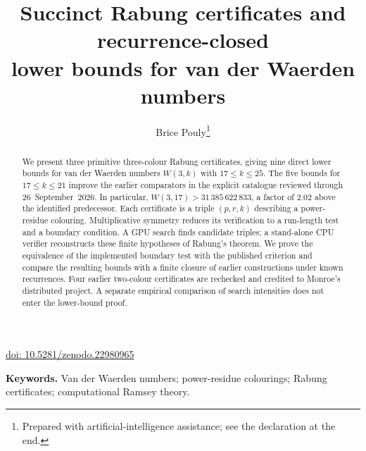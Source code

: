 \documentclass[11pt]{article}
\title{Succinct Rabung certificates and recurrence-closed\\
lower bounds for van der Waerden numbers}
\author{Brice Pouly\thanks{Prepared with artificial-intelligence assistance; see the declaration at the end.}}
\date{}
\theoremstyle{definition}\newtheorem{definition}[theorem]{Definition}\newtheorem{remark}[theorem]{Remark}
\begin{document}
\maketitle
{\centering\small\href{https://doi.org/10.5281/zenodo.22980965}{doi: 10.5281/zenodo.22980965}\par}
\medskip
\begin{abstract}
We present three primitive three-colour Rabung certificates, giving nine
direct lower bounds for van der Waerden numbers $W(3,k)$ with $17\le k\le25$.
The five bounds for $17\le k\le21$ improve the earlier comparators in the
explicit catalogue reviewed through 26~September~2026. In particular,
$W(3,17)>31\,385\,622\,833$, a factor of $2.02$ above the identified
predecessor. Each certificate is a triple $(p,r,k)$ describing a power-residue
colouring. Multiplicative symmetry reduces its verification to a run-length
test and a boundary condition. A GPU search finds candidate triples; a
stand-alone CPU verifier reconstructs these finite hypotheses of Rabung's
theorem. We prove the equivalence of the implemented boundary test with the
published criterion and compare the resulting bounds with a finite closure
of earlier constructions under known recurrences. Four earlier two-colour
certificates are rechecked and credited to Monroe's distributed project.
A separate empirical comparison of search intensities does not enter the
lower-bound proof.
\end{abstract}
\noindent\textbf{Keywords.} Van der Waerden numbers; power-residue colourings;
Rabung certificates; computational Ramsey theory.
\clearpage
\setcounter{tocdepth}{1}
\tableofcontents
\bigskip






\appendix








\begingroup\small
\setlength{\bibsep}{3pt}
{}

\endgroup
\end{document}
